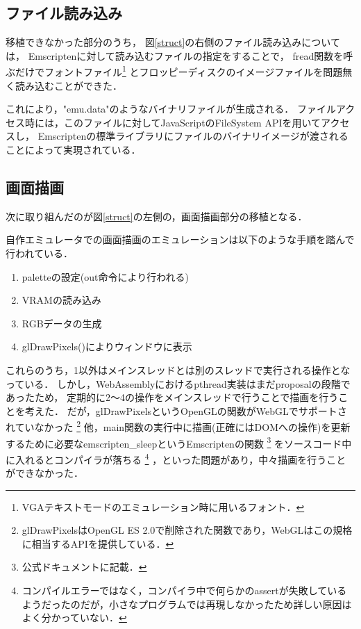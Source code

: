 \documentclass[a4j,10pt]{jsarticle}
\begin{document}
\subsection{ファイル読み込み}
移植できなかった部分のうち，
図\ref{struct}の右側のファイル読み込みについては，
Emscriptenに対して読み込むファイルの指定をすることで，
fread関数を呼ぶだけでフォントファイル\footnote{VGAテキストモードのエミュレーション時に用いるフォント．}
とフロッピーディスクのイメージファイルを問題無く読み込むことができた．

これにより，"emu.data"のようなバイナリファイルが生成される．
ファイルアクセス時には，このファイルに対してJavaScriptのFileSystem APIを用いてアクセスし，
Emscriptenの標準ライブラリにファイルのバイナリイメージが渡されることによって実現されている．

\subsection{画面描画}

次に取り組んだのが図\ref{struct}の左側の，画面描画部分の移植となる．

自作エミュレータでの画面描画のエミュレーションは以下のような手順を踏んで行われている．

\begin{enumerate}
	\item paletteの設定(out命令により行われる)
	\item VRAMの読み込み
	\item RGBデータの生成
	\item glDrawPixels()によりウィンドウに表示
\end{enumerate}

これらのうち，1以外はメインスレッドとは別のスレッドで実行される操作となっている．
しかし，WebAssemblyにおけるpthread実装はまだproposalの段階であったため，
定期的に2〜4の操作をメインスレッドで行うことで描画を行うことを考えた．
だが，glDrawPixelsというOpenGLの関数がWebGLでサポートされていなかった
\footnote{glDrawPixelsはOpenGL ES 2.0で削除された関数であり，WebGLはこの規格に相当するAPIを提供している．}
他，main関数の実行中に描画(正確にはDOMへの操作)を更新するために必要なemscripten\_sleepというEmscriptenの関数
\footnote{公式ドキュメント\cite{emscripten-asyncify}に記載．}
をソースコード中に入れるとコンパイラが落ちる
\footnote{コンパイルエラーではなく，コンパイラ中で何らかのassertが失敗しているようだったのだが，小さなプログラムでは再現しなかったため詳しい原因はよく分かっていない．}
，といった問題があり，中々描画を行うことができなかった．
\end{document}
